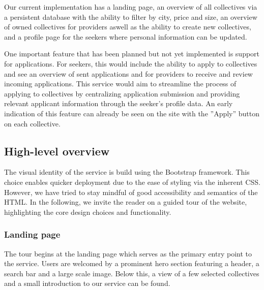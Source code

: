 Our current implementation has a landing page, an overview of all collectives via a persistent database with the ability to filter by city, price and size,
an overview of owned collectives for providers aswell as the ability to create new collectives, and a profile page for the seekers where personal information can be updated.

One important feature that has been planned but not yet implemented is support for applications.
For seekers, this would include the ability to apply to collectives and see an overview of sent applications and for providers
to receive and review incoming applications.
This service would aim to streamline the process of applying to collectives by centralizing application submission
and providing relevant applicant information through the seeker's profile data.
An early indication of this feature can already be seen on the site with the ''Apply'' button on each collective.


\subsection{High-level overview}

The visual identity of the service is build using the Bootstrap framework. 
This choice enables quicker deployment due to the ease of styling via the inherent CSS. 
However, we have tried to stay mindful of good accessibility and semantics of the HTML. 
In the following, we invite the reader on a guided tour of the website, highlighting the core
design choices and functionality.

\subsubsection{Landing page}

The tour begins at the landing page which serves as the primary entry point to the service.
Users are welcomed by a prominent hero section featuring a header, a search bar and a large scale image.
Below this, a view of a few selected collectives and a small introduction to our service can be found. 

